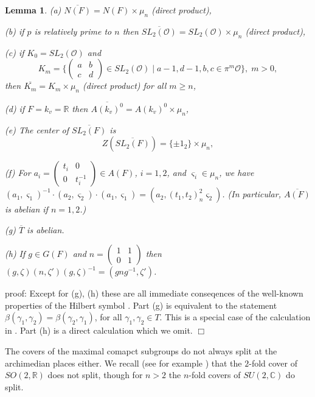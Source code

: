\documentclass[12pt]{article}
\numberwithin{equation}{section}
\newtheorem{lemma}[theorem]{Lemma}
\begin{document}
\begin{lemma}\label{lem:2.2}
(a) $\overline{N(F)}=N(F)\times \mu _n$ (direct product),

(b) if $p$ is relatively prime to $n$ then 
$\overline{SL_2({\mathcal{O}})}=SL_2({\mathcal{O}})\times \mu _n$ 
(direct product),

(c) if $K_0=SL_2({\mathcal{O}})$ and 
\[
K_m=\{\left( 
\begin{array}{cc}
a & b \\ 
c & d
\end{array}
\right) \in SL_2({\mathcal{O}})\;|\;a-1,d-1,b,c\in \pi ^m{\mathcal{O}}\},\;m>0,
\]
then $\overline{K_m}=K_m\times \mu _n$ (direct product) for all $m\geq n$,

(d) if $F=k_v=\mathbb{R}$ then 
$\overline{A(k_v)^0}=A(k_v)^0\times \mu _n$,

(e) The center of $\overline{SL_2(F)}$ is 
\[
Z(\overline{SL_2(F)})=
\{\pm 1_2\}\times \mu _n,
\]

(f) For $a_i=\left( 
\begin{array}{cc}
t_i & 0 \\ 
0 & t_i^{-1}
\end{array}
\right) \in A(F)$, $i=1,2$, and $\varsigma _i\in \mu _n$,
we have $(a_1,\varsigma _1)^{-1}\cdot
(a_2,\varsigma _2)\cdot (a_1,\varsigma
_1)=(a_2,(t_1,t_2)_n^2\varsigma _2)$.
(In particular, $\overline{A(F)}$ is abelian if $n=1,2$.)

(g) $ \overline{T}$ is abelian.

(h) If $g\in G(F)$ and
$n=
\left(
\begin{array}{cc}
1 & 1\\
0 & 1
\end{array}
\right)
$
then $(g,\zeta)(n,\zeta ')(g,\zeta)^{-1}
=(gng^{-1},\zeta')$.
\end{lemma}

proof: Except for (g), (h)
these are all immediate conseqences of the well-known properties of
the Hilbert symbol \cite{W1}. Part (g) is equivalent to the statement
$\beta(\gamma_1, \gamma_2)=\beta(\gamma_2, \gamma_1)$,
for all $\gamma_1, \gamma_2\in T$. This 
is a special case of the calculation in \cite[p. 128]{Fl}.
Part (h) is a direct calculation which we omit. 
$\Box $

The covers of the maximal comapct subgroups do not always split
at the archimedian places either.
We recall (see for example \cite{Ge2}) that the $2$-fold cover of 
$SO(2,{\mathbb R})$ does not split, though for $n>2$ the $n$-fold
covers of $SU(2,{\mathbb C})$ do split.
\end{document}
